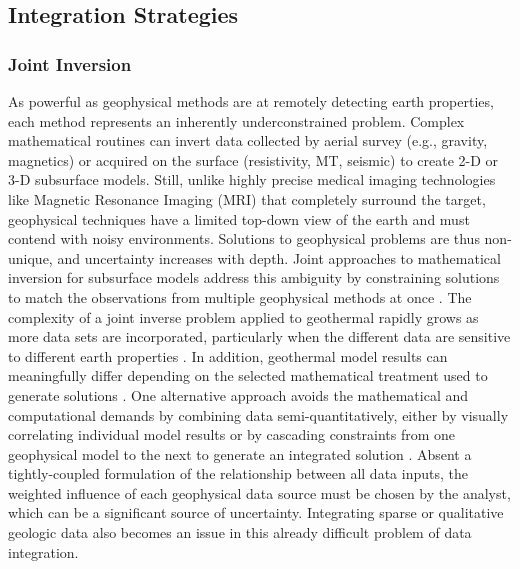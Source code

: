 \subsection{Integration Strategies}\label{ch2:integration_strategies}
\subsubsection{Joint Inversion}\label{ch2:joint_invert}
As powerful as geophysical methods are at remotely detecting earth properties, each method represents an inherently underconstrained problem. Complex mathematical routines can invert data collected by aerial survey (e.g., gravity, magnetics) or acquired on the surface (resistivity, MT, seismic) to create 2-D or 3-D subsurface models. Still, unlike highly precise medical imaging technologies like Magnetic Resonance Imaging (MRI) that completely surround the target, geophysical techniques have a limited top-down view of the earth and must contend with noisy environments. Solutions to geophysical problems are thus non-unique, and uncertainty increases with depth. Joint approaches to mathematical inversion for subsurface models address this ambiguity by constraining solutions to match the observations from multiple geophysical methods at once \citep{vozoff_joint_1975}. The complexity of a joint inverse problem applied to geothermal rapidly grows as more data sets are incorporated, particularly when the different data are sensitive to different earth properties \citep{moorkamp_framework_2011}. In addition, geothermal model results can meaningfully differ depending on the selected mathematical treatment used to generate solutions \citep{rosenkjaer_comparison_2015}. One alternative approach avoids the mathematical and computational demands by combining data semi-quantitatively, either by visually correlating individual model results or by cascading constraints from one geophysical model to the next to generate an integrated solution \citep{jousset_hengill_2011, lichoro_joint_2019}. Absent a tightly-coupled formulation of the relationship between all data inputs, the weighted influence of each geophysical data source must be chosen by the analyst, which can be a significant source of uncertainty. Integrating sparse or qualitative geologic data also becomes an issue in this already difficult problem of data integration.

